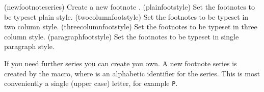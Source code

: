 %


\begin{syntax}
\cmd{\newfootnoteseries} \\
\cmd{\plainfootstyle} \\
\cmd{\twocolumnfootstyle} \\
\cmd{\threecolumnfootstyle} \\
\cmd{\paragraphfootstyle} \\
\end{syntax}
\glossary(newfootnoteseries)%
  {}%
  {Create a new footnote .}
\glossary(plainfootstyle)%
  {}%
  {Set the  footnotes to be typeset plain style.}
\glossary(twocolumnfootstyle)%
  {}%
  {Set the  footnotes to be typeset in two column style.}
\glossary(threecolumnfootstyle)%
  {}%
  {Set the  footnotes to be typeset in three column style.}
\glossary(paragraphfootstyle)%
  {}%
  {Set the  footnotes to be typeset in single paragraph style.}

    If you need further series you can create you own.
A new footnote series is
created by the \cmd{\newfootseries} macro, where  is an
alphabetic identifier for the series. This is most conveniently a 
single (upper case) letter, for example \texttt{P}. 

